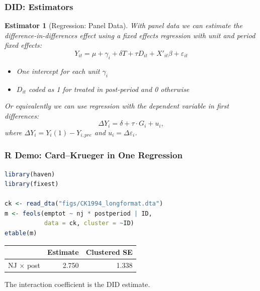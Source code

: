 \documentclass[xcolor=svgnames,9pt,english, aspectratio=169]{beamer}
\newtheorem{esti}{Estimator}
\begin{document}
\begin{frame}
  \frametitle{DID: Estimators}
\begin{esti}[Regression: Panel Data]\small
With panel data we can estimate the difference-in-differences effect using a fixed effects regression with unit and  period fixed effects:
\[
Y_{it} = \mu + \gamma_i + \delta T + \tau D_{it} + X'_{it}\beta + \varepsilon_{it}
\]\vspace*{-0.5cm}

\begin{itemize}
\item One intercept for each unit $\gamma_i$
\item $D_{it}$ coded as 1 for treated in post-period and 0 otherwise
\end{itemize}

Or equivalently we can use regression with the dependent variable in first differences:
\[
\Delta Y_i = \delta + \tau \cdot G_i + u_i,
\]
where $\Delta Y_i = Y_i(1)-Y_{i,pre}$ and $u_i=\Delta \varepsilon_i$.\\\bigskip
\end{esti}
\end{frame}










\begin{frame}[fragile]
  \frametitle{R Demo: Card--Krueger in One Regression}
\begin{lstlisting}[language=R]
library(haven)
library(fixest)

ck <- read_dta("figs/CK1994_longformat.dta")
m <- feols(emptot ~ nj * postperiod | ID,
           data = ck, cluster = ~ID)
etable(m)
\end{lstlisting}
\begin{center}
\begin{tabular}{lrr}
 & Estimate & Clustered SE \\ \hline
NJ $\times$ post & 2.750 & 1.338 \\
\end{tabular}
\end{center}
The interaction coefficient is the DID estimate.
\end{frame}
\end{document}
